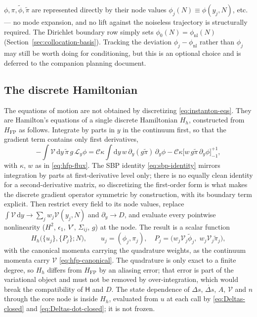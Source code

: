 \documentclass[a4paper,11pt]{article}
\renewcommand{\d}{\mathrm{d}}
\newcommand{\Ny}{N}                          %
\newcommand{\epsSR}{\epsilon_1}              %
\newcommand{\Hub}{H}                         %
\newcommand{\field}{\phi}                    %
\newcommand{\mom}{\pi}                       %
\newcommand{\Vpot}{V}                        %
\newcommand{\phinl}{\field_{\mathrm{nl}}}    %
\newcommand{\rfield}{\widetilde\field}       %
\newcommand{\rmom}{\widetilde\mom}           %
\newcommand{\yco}{y}                         %
\newcommand{\Deltas}{\Delta s}                %
\newcommand{\advcoef}{A}                     %
\newcommand{\weightfn}{w}                    %
\newcommand{\Lop}{\mathcal{L}_\yco}          %
\newcommand{\ncount}{n}                      %
\newcommand{\volel}{\mathcal{V}}             %
\newcommand{\Cpref}{\mathcal{C}}             %
\newcommand{\Sigvol}[1]{\varSigma_{#1}}      %
\newcommand{\Hfp}{H_{\mathrm{FP}}}            %
\newcommand{\Hh}{H_h}                         %
\newcommand{\Hnorm}{\mathsf{H}}               %
\newcommand{\gpref}{g}                        %
\begin{document}
$\field,\mom,\rfield,\rmom$ are represented directly by their node values
$\field_j(\Ny)\equiv\field(\yco_j,\Ny)$, etc. --- no mode expansion, and no
lift against the noiseless trajectory is structurally required. The
Dirichlet boundary row simply sets $\field_0(\Ny)=\phinl(\Ny)$
(Section~\ref{sec:collocation-basis}). Tracking the deviation
$\field_j-\phinl$ rather than $\field_j$ may still be worth doing for
conditioning, but this is an optional choice and is deferred to the
companion planning document.

\subsection{The discrete Hamiltonian}
\label{sec:discrete-hamiltonian}

The equations of motion are not obtained by discretizing
\eqref{eq:instanton-eqs}. They are Hamilton's equations of a single
discrete Hamiltonian $\Hh$, constructed from $\Hfp$ as follows.
Integrate by parts in $\yco$ in the continuum first, so that the gradient
term contains only first derivatives,
\begin{equation}
    -\int\volel\,\d\yco\,\rmom\,\gpref\,\Lop\field
    = \Cpref\kappa\int\d\yco\,\weightfn\,\partial_\yco(\gpref\rmom)\,\partial_\yco\field
    - \Cpref\kappa\big[\weightfn\,\gpref\rmom\,\partial_\yco\field\big]_{-1}^{+1} ,
\end{equation}
with $\kappa$, $\weightfn$ as in \eqref{eq:hfp-flux}. The SBP identity
\eqref{eq:sbp-identity} mirrors integration by parts at first-derivative
level only; there is no equally clean identity for a second-derivative
matrix, so discretizing the first-order form is what makes the discrete
gradient operator symmetric by construction, with its boundary term
explicit. Then restrict every field to its node values, replace
$\int\volel\,\d\yco\to\sum_jw_j\volel(\yco_j,\Ny)$ and
$\partial_\yco\to D$, and evaluate every pointwise nonlinearity
($\Hub^2$, $\epsSR$, $\Vpot'$, $\Sigvol{ij}$, $\gpref$) at the node. The
result is a scalar function
\begin{equation}
    \Hh\big(\{u_j\},\{P_j\};\Ny\big) ,
    \qquad u_j=(\field_j,\mom_j) , \quad P_j = \big(w_j\volel_j\rfield_j,\; w_j\volel_j\rmom_j\big) ,
\end{equation}
with the canonical momenta carrying the quadrature weights, as the
continuum momenta carry $\volel$ \eqref{eq:hfp-canonical}. The quadrature
is only exact to a finite degree, so $\Hh$ differs from $\Hfp$ by an
aliasing error; that error is part of the variational object and must
not be removed by over-integration, which would break the compatibility
of $\Hnorm$ and $D$. The state dependence of $\Deltas$, $\dot{\Deltas}$,
$\advcoef$, $\volel$ and $\ncount$ through the core node is inside $\Hh$,
evaluated from $u$ at each call by \eqref{eq:Deltas-closed} and
\eqref{eq:Deltas-dot-closed}; it is not frozen.
\end{document}
